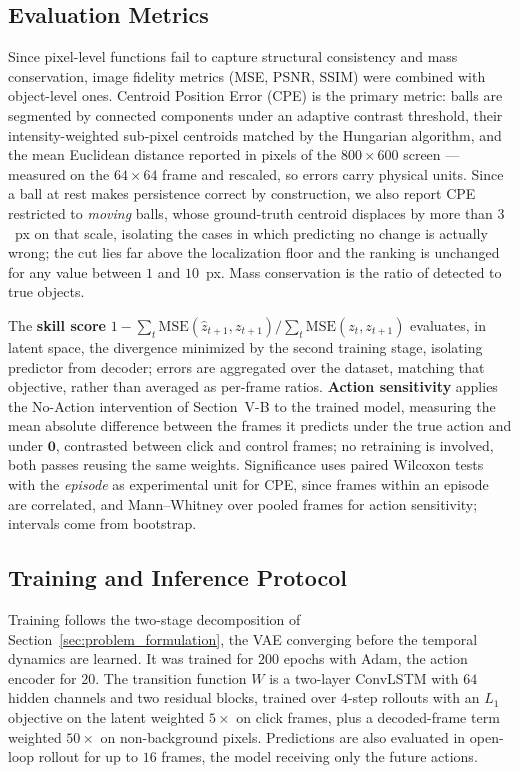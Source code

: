 \documentclass[conference]{IEEEtran}
\begin{document}
\subsection{Evaluation Metrics}
\label{subsec:metrics}
Since pixel-level functions fail to capture structural consistency and mass conservation, image fidelity metrics (MSE, PSNR, SSIM) were combined with object-level ones. Centroid Position Error (CPE) is the primary metric: balls are segmented by connected components under an adaptive contrast threshold, their intensity-weighted sub-pixel centroids matched by the Hungarian algorithm, and the mean Euclidean distance reported in pixels of the $800 \times 600$ screen --- measured on the $64 \times 64$ frame and rescaled, so errors carry physical units. Since a ball at rest makes persistence correct by construction, we also report CPE restricted to \emph{moving} balls, whose ground-truth centroid displaces by more than $3$~px on that scale, isolating the cases in which predicting no change is actually wrong; the cut lies far above the localization floor and the ranking is unchanged for any value between $1$ and $10$~px. Mass conservation is the ratio of detected to true objects.

The \textbf{skill score} $1 - \sum_t \mathrm{MSE}(\hat{z}_{t+1}, z_{t+1}) / \sum_t \mathrm{MSE}(z_t, z_{t+1})$ evaluates, in latent space, the divergence minimized by the second training stage, isolating predictor from decoder; errors are aggregated over the dataset, matching that objective, rather than averaged as per-frame ratios. \textbf{Action sensitivity} applies the No-Action intervention of Section~V-B to the trained model, measuring the mean absolute difference between the frames it predicts under the true action and under $\mathbf{0}$, contrasted between click and control frames; no retraining is involved, both passes reusing the same weights. Significance uses paired Wilcoxon tests with the \emph{episode} as experimental unit for CPE, since frames within an episode are correlated, and Mann--Whitney over pooled frames for action sensitivity; intervals come from bootstrap.
\subsection{Training and Inference Protocol}
\label{subsec:protocol}
Training follows the two-stage decomposition of Section~\ref{sec:problem_formulation}, the VAE converging before the temporal dynamics are learned. It was trained for $200$ epochs with Adam, the action encoder for $20$. The transition function $W$ is a two-layer ConvLSTM with $64$ hidden channels and two residual blocks, trained over $4$-step rollouts with an $L_1$ objective on the latent weighted $5\times$ on click frames, plus a decoded-frame term weighted $50\times$ on non-background pixels. Predictions are also evaluated in open-loop rollout for up to $16$ frames, the model receiving only the future actions.
\end{document}
